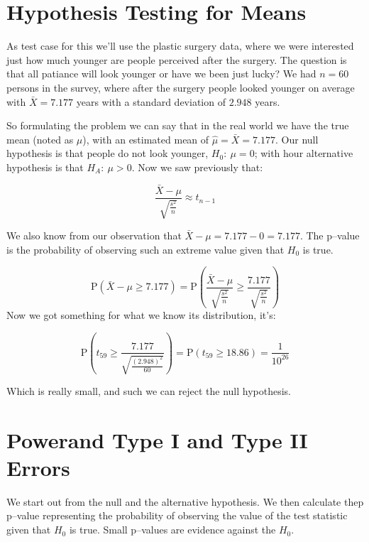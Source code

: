 \section{Hypothesis Testing for Means}

As test case for this we'll use the plastic surgery data, where we were
interested just how much younger are people perceived after the surgery. The
question is that all patiance will look younger or have we been just lucky? We
had $n=60$ persons in the survey, where after the surgery people looked younger
on average with $\bar{X}=7.177$ years with a standard deviation of $2.948$
years.

So formulating the problem we can say that in the real world we have the true
mean (noted as $\mu$), with an estimated mean of $\hat{\mu}=\bar{X}=7.177$. Our
null hypothesis is that people do not look younger, $H_0:~\mu=0$; with hour
alternative hypothesis is that $H_A:~\mu>0$. Now we saw previously that:

\[ \frac{\bar{X}-\mu}{\sqrt{\frac{s^2}{n}}}  \approx t_{n-1}
\]

We also know from our observation that $\bar{X}-\mu=7.177-0=7.177$. The p--value
is the probability of observing such an extreme value given that $H_0$ is true.

\[ \mbox{P} \left( \bar{X} - \mu \geq 7.177\right) =
\mbox{P} \left( \frac{\bar{X}-\mu}{\sqrt{\frac{s^2}{n}}} \geq
\frac{7.177}{\sqrt{\frac{s^2}{n}}}  \right)
\]
Now we got something for what we know its distribution, it's:

\[ \mbox{P} \left( t_{59} \geq \frac{7.177}{\sqrt{\frac{(2.948)^2}{60}}}\right)
= \mbox{P} \left( t_{59} \geq 18.86 \right) = \frac{1}{10^{26}}
\]

Which is really small, and such we can reject the null hypothesis.

\section{Powerand Type I and Type II Errors}

We start out from the null and the alternative hypothesis. We then calculate
thep p--value representing the probability of observing the value of the test
statistic given that $H_0$ is true. Small p--values are evidence against the
$H_0$.


